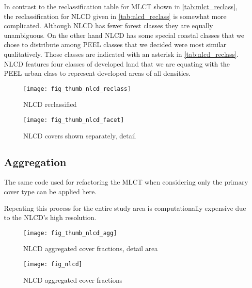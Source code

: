 In contrast to the reclassification table for MLCT shown in
\autoref{tab:mlct_reclass}, the reclassification for NLCD given in
\autoref{tab:nlcd_reclass} is somewhat more complicated.  Although
NLCD has fewer forest classes they are equally unambiguous.  On the
other hand NLCD has some special coastal classes that we chose to
distribute among PEEL classes that we decided were most similar
qualitatively.  Those classes are indicated with an asterisk in
\autoref{tab:nlcd_reclass}.  NLCD features four classes of developed
land that we are equating with the PEEL urban class to represent
developed areas of all densities.



\begin{figure}[hpt] 
\centering


\texttt{[image: fig\_thumb\_nlcd\_reclass]}
 
\caption{NLCD reclassified} 
\label{fig:thumb_nlcd_reclass} 
\end{figure} 

\begin{figure}[hpt] 
\centering
  

\texttt{[image: fig\_thumb\_nlcd\_facet]}
 
\caption{NLCD covers shown separately, detail} 
\label{fig:thumb_nlcd_facet} 
\end{figure} 

\subsection{Aggregation}
\label{sec:nlcd-aggr}

The same code used for refactoring the MLCT when considering only the
primary cover type can be applied here.

Repeating this process for the entire study area is computationally
expensive due to the NLCD's high resolution.


 

\begin{figure}[hpt] 
\centering
  


\texttt{[image: fig\_thumb\_nlcd\_agg]}
 
\caption{NLCD aggregated cover fractions, detail area}
\label{fig:thumb_nlcd_agg}
\end{figure} 



\begin{figure}[hpt] 
  \centering
  
  \texttt{[image: fig\_nlcd]}
\caption{NLCD aggregated cover fractions}
\label{fig:nlcd}
\end{figure} 

